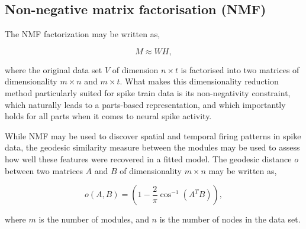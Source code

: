 \documentclass[mphil,deptreport,ianc]{infthesis} %
\begin{document}
\subsection{Non-negative matrix factorisation (NMF)}

The NMF factorization may be written as,

\begin{equation}
    M \approx WH,
\end{equation}

where the original data set $V$ of dimension $n \times t$ is factorised into two matrices of dimensionality $m \times n$ and $m \times t$.
What makes this dimensionality reduction method particularly suited for spike train data is its non-negativity constraint, which naturally leads to a parts-based representation, and which importantly holds for all parts when it comes to neural spike activity.

While NMF may be used to discover spatial and temporal firing patterns in spike data, the geodesic similarity measure between the modules may be used to assess how well these features were recovered in a fitted model.
The geodesic distance $o$ between two matrices $A$ and $B$ of dimensionality $m \times n$ may be written as,

\begin{equation}
    o(A, B) = (1-\frac{2}{\pi}\cos^{-1}(A^TB)),
\end{equation}

where $m$ is the number of modules, and $n$ is the number of nodes in the data set. 


\end{document}

